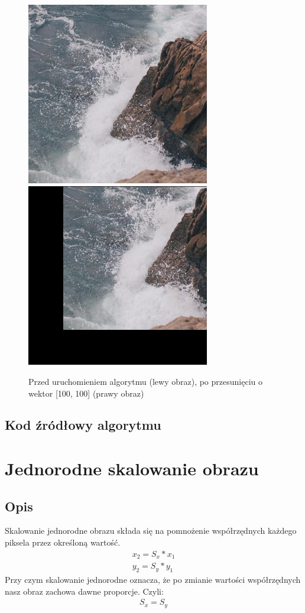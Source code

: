 \documentclass[a4paper,12pt]{book}
\begin{document}
\begin{figure}[H]
	\caption{Przed uruchomieniem algorytmu (lewy obraz), po przesunięciu o wektor [100, 100] (prawy obraz)}
	\includegraphics[width=8cm, height=8cm]{sea-unmodified.jpg}
	\includegraphics[width=8cm, height=8cm]{4-1/translate-sea.png}
\end{figure}

\subsection*{Kod źródłowy algorytmu}

\section{Jednorodne skalowanie obrazu}
\subsection*{Opis}
Skalowanie jednorodne obrazu składa się na pomnożenie współrzędnych każdego piksela przez określoną wartość. 
\begin{gather}
	x_2 = S_x * x_1 \\
	y_2 = S_y * y_1
\end{gather}
Przy czym skalowanie jednorodne oznacza, że po zmianie wartości współrzędnych nasz obraz zachowa dawne proporcje. Czyli: 
\begin{gather}
	S_x = S_y
\end{gather}
\end{document}
